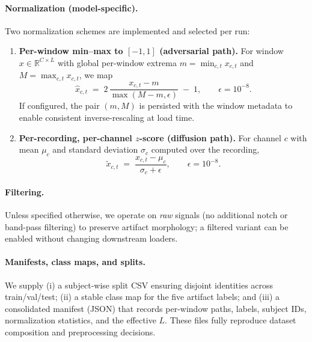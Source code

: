 \documentclass{article}
\begin{document}
\paragraph{Normalization (model-specific).}
Two normalization schemes are implemented and selected per run:
\begin{enumerate}
\item \textbf{Per-window min--max to \([-1,1]\) (adversarial path).} For window \(x \in \mathbb{R}^{C\times L}\) with global per-window extrema \(m=\min_{c,t} x_{c,t}\) and \(M=\max_{c,t} x_{c,t}\), we map
\begin{equation}
\hat{x}_{c,t} \;=\; 2\,\frac{x_{c,t}-m}{\max(M-m,\epsilon)} \;-\; 1, \qquad \epsilon = 10^{-8}.
\end{equation}
If configured, the pair \((m,M)\) is persisted with the window metadata to enable consistent inverse-rescaling at load time.
\item \textbf{Per-recording, per-channel \(z\)-score (diffusion path).} For channel \(c\) with mean \(\mu_c\) and standard deviation \(\sigma_c\) computed over the recording,
\begin{equation}
\tilde{x}_{c,t} \;=\; \frac{x_{c,t}-\mu_c}{\sigma_c + \epsilon}, \qquad \epsilon = 10^{-8}.
\end{equation}
\end{enumerate}

\paragraph{Filtering.}
Unless specified otherwise, we operate on \emph{raw} signals (no additional notch or band-pass filtering) to preserve artifact morphology; a filtered variant can be enabled without changing downstream loaders.

\paragraph{Manifests, class maps, and splits.}
We supply (i) a subject-wise split CSV ensuring disjoint identities across train/val/test; (ii) a stable class map for the five artifact labels; and (iii) a consolidated manifest (JSON) that records per-window paths, labels, subject IDs, normalization statistics, and the effective \(L\). These files fully reproduce dataset composition and preprocessing decisions.

\begin{table}[t]
  \centering
  \caption{Subject counts per split (auto-generated).}
  \label{tab:splits}
  
\end{table}
\end{document}
